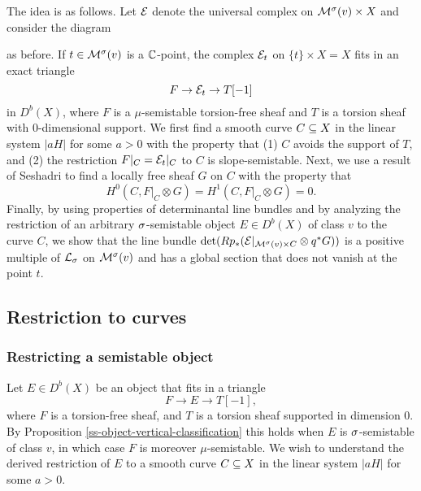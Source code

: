 \documentclass[letterpaper,11pt]{amsart}%
\theoremstyle{remark}
\begin{document}
The idea is as follows. Let $\mathcal{E}$ denote the universal complex on $\mathcal{M}^\sigma(v) \times X$ and consider the diagram
\begin{center}
\end{center}
as before. If $t \in \mathcal{M}^\sigma(v)$ is a $\mathbb{C}$-point, the complex $\mathcal{E}_t$ on $\{t\} \times X = X$ fits in an exact triangle
\[ F \to \mathcal{E}_t \to T[-1] \]
in $D^b(X)$, where $F$ is a $\mu$-semistable torsion-free sheaf and $T$ is a torsion sheaf with 0-dimensional support. We first find a smooth curve $C \subseteq X$ in the linear system $|a H|$ for some $a > 0$ with the property that (1) $C$ avoids the support of $T$, and (2) the restriction $F|_C = \mathcal{E}_t|_C$ to $C$ is slope-semistable. Next, we use a result of Seshadri to find a locally free sheaf $G$ on $C$ with the property that 
\[ H^0(C, F|_C \otimes G) = H^1(C, F|_C \otimes G) = 0. \]
Finally, by using properties of determinantal line bundles and by analyzing the restriction of an arbitrary $\sigma$-semistable object $E \in D^b(X)$ of class $v$ to the curve $C$, we show that the line bundle $\det(R p_*(\mathcal{E}|_{\mathcal{M}^\sigma(v) \times C} \otimes q^*G))$ is a positive multiple of $\mathcal{L}_\sigma$ on $\mathcal{M}^\sigma(v)$ and has a global section that does not vanish at the point $t$. 

\subsection{Restriction to curves}

\subsubsection{Restricting a semistable object}
Let $E \in D^b(X)$ be an object that fits in a triangle
\[ F \to E \to T[-1], \]
where $F$ is a torsion-free sheaf, and $T$ is a torsion sheaf supported in dimension 0. By Proposition \ref{ss-object-vertical-classification} this holds when $E$ is $\sigma$-semistable of class $v$, in which case $F$ is moreover $\mu$-semistable. We wish to understand the derived restriction of $E$ to a smooth curve $C \subseteq X$ in the linear system $|a H|$ for some $a > 0$.
\end{document}
